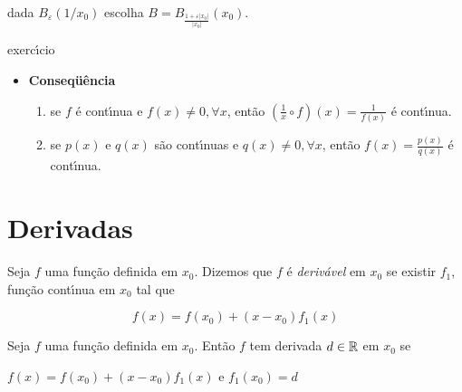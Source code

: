 \documentclass{book}
\begin{document}
\begin{sol}
dada $B_\varepsilon \left( {1 / x_0 } \right)$ escolha $B = B_{\frac{1 +    \varepsilon \left| {x_0 } \right|}{\left| {x_0 } \right|}} \left( {x_0 }    \right)$.

exerc\'{\i}cio
\end{sol}

\begin{itemize}

\item \textbf{Conseq\"{u}\^{e}ncia}

\begin{enumerate}

\item se $f$ \'{e} cont\'{\i}nua e $f\left( x \right) \ne 0,\forall x$,
ent\~ao $\left( {\frac{1}{x} \circ f} \right)\left( x \right) =
\frac{1}{f\left( x \right)}$ \'{e} cont\'{\i}nua.

\item se $p\left( x \right)$ e $q\left( x \right)$ s\~ao cont\'{\i}nuas e
$q\left( x \right) \ne 0,\forall x$, ent\~ao $f\left( x \right) =
\frac{p\left( x \right)}{q\left( x \right)}$ \'{e} cont\'{\i}nua.

\end{enumerate}

\end{itemize}



\section{Derivadas} \label{sec02}

\begin{defn}
Seja $f$ uma fun\c c\~ao definida em $x_0 $. Dizemos que $f$ \'{e} \textit{deriv\'avel} em $x_0 $ se existir $f_1 $, fun\c c\~ao cont\'{\i}nua em $x_0 $ tal que

\[\boxed{
f\left( x \right) = f\left( {x_0 } \right) + \left( {x - x_0 } \right)f_1
\left( x \right)}
\]

\end{defn}

\begin{defn}

Seja $f$ uma fun\c c\~ao definida em $x_0 $. Ent\~ao $f$ tem derivada
$d \in \mathbb{R}$ em $x_0 $ se

$f\left( x \right) = f\left( {x_0 } \right) + \left( {x - x_0 } \right)f_1
\left( x \right)$ e $f_1 \left( {x_0 } \right) = d$

\end{defn}
\end{document}
